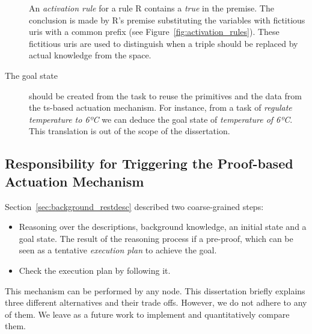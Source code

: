 \begin{description}

	An \emph{activation rule} for a rule R contains a \emph{true} in the premise.
	The conclusion is made by R's premise substituting the variables with fictitious \acsp{uri} with a common prefix (see Figure~\ref{fig:activation_rules}).
	These fictitious \acsp{uri} are used to distinguish when a triple should be replaced by actual knowledge from the space. %


  \item[The goal state] should be created from the task to reuse the primitives and the data from the \ac{ts}-based actuation mechanism.
	For instance, from a task of \emph{regulate temperature to 6ºC} we can deduce the goal state of \emph{temperature of 6ºC}.
	This translation is out of the scope of the dissertation.
\end{description}


\subsection{Responsibility for Triggering the Proof-based Actuation Mechanism}
\label{sec:responsible_proof}

Section~\ref{sec:background_restdesc} described two coarse-grained steps:
\begin{itemize}
  \item Reasoning over the descriptions, background knowledge, an initial state and a goal state.
        The result of the reasoning process if a pre-proof, which can be seen as a tentative \emph{execution plan} to achieve the goal.
  \item Check the execution plan by following it.
\end{itemize}


This mechanism can be performed by any node.
This dissertation briefly explains three different alternatives and their trade offs.
However, we do not adhere to any of them.
We leave as a future work to implement and quantitatively compare them.

